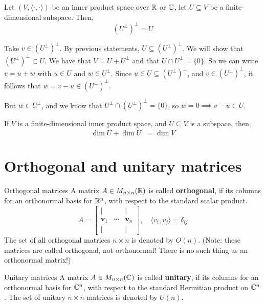 \documentclass[12pt]{article}
\begin{document}
\begin{corollary}{}{}
    Let $(V, \langle \cdot, \cdot \rangle)$ be an inner product space over $\mathbb{R}$ or $\mathbb{C}$, let $U \subseteq V$ be a finite-dimensional subspace. Then,
    $$
        \left(U^\perp\right)^\perp = U
    $$
\end{corollary}

\begin{proofbox}
    Take $v \in (U^\perp)^\perp$. By previous statements, $U \subseteq (U^\perp)^\perp$. We will show that $(U^\perp)^\perp \subset U$. We have that $V = U + U^\perp$ and that $U \cap U^\perp = \{0\}$. So we can write $v = u + w$ with $u \in U$ and $w \in U^\perp$. Since $u \in U \subseteq \left(U^\perp\right)^\perp$, and $v \in (U^\perp)^\perp$, it follows that $w = v - u \in (U^\perp)^\perp$.

    But $w \in U^\perp$, and we know that $U^\perp \cap (U^\perp)^\perp = \{0\}$, so $w = 0 \implies v - u \in U$.
\end{proofbox}

\begin{corollary}{}{}
    If $V$ is a finite-dimensional inner product space, and $U \subseteq V$ is a subspace, then,
    $$
        \dim U + \dim U^\perp = \dim V
    $$
\end{corollary}

\section{Orthogonal and unitary matrices}

\begin{definition}{Orthogonal matrices}{}
    A matrix $A \in M_{n \times n}(\mathbb{R})$ is called \textbf{orthogonal}, if its columns for an orthonormal basis for $\mathbb{R}^n$, with respect to the standard scalar product.
    $$
        A = \left[
            \begin{array}{cccc}
            | &  & | \\
            \mathbf{v}_1& \cdots & \mathbf{v}_n \\
            | &  & |
            \end{array}
            \right],\quad \langle v_i, v_j \rangle = \delta_{ij}
    $$
    The set of all orthogonal matrices $n \times n$ is denoted by $O(n)$. (Note: these matrices are called orthogonal, not orthonormal! There is no such thing as an orthonormal matrix!)
\end{definition}

\begin{definition}{Unitary matrices}{}
    A matrix $A \in M_{n \times n}(\mathbb{C})$ is called \textbf{unitary}, if its columns for an orthonormal basis for $\mathbb{C}^n$, with respect to the standard Hermitian product on $\mathbb{C}^n$. The set of unitary $n \times n$ matrices is denoted by $U(n)$.
\end{definition}
\end{document}
